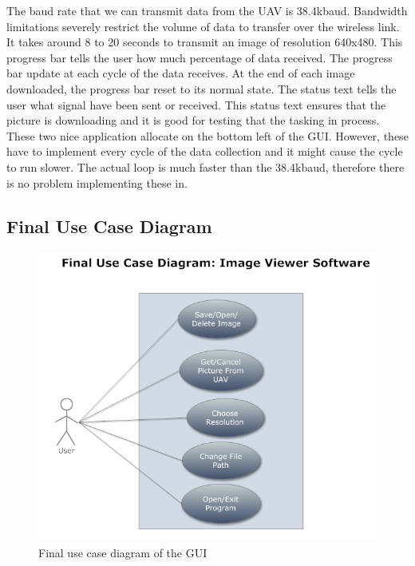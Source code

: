 \documentclass[oneside]{ecsgdp}         %
\begin{document}
The baud rate that we can transmit data from the UAV is 38.4kbaud. Bandwidth limitations severely restrict the volume of data to transfer over the wireless link. It takes around 8 to 20 seconds to transmit an image of resolution 640x480. This progress bar tells the user how much percentage of data received. The progress bar update at each cycle of the data receives. At the end of each image downloaded, the progress bar reset to its normal state.  The status text tells the user what signal have been sent or received. This status text ensures that the picture is downloading and it is good for testing that the tasking in process. These two nice application allocate on the bottom left of the GUI. However, these have to implement every cycle of the data collection and it might cause the cycle to run slower. The actual loop is much faster than the 38.4kbaud, therefore there is no problem implementing these in.

\subsection{Final Use Case Diagram}
\begin{center}
\begin{figure}[!hbtp]
\includegraphics[scale=0.7]{FinaluserCase.PNG} 
\caption{Final use case diagram of the GUI\label{GUI_finalUseCase}}
\end{figure}
\end{center}
\end{document}

